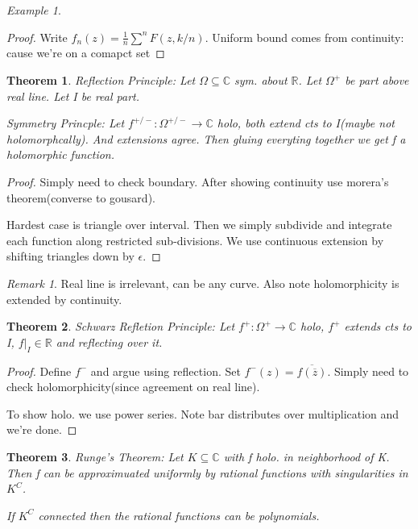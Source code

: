 \documentclass[11pt]{article}
\newcommand{\R}{\mathbb{R}}
\newcommand{\C}{\mathbb{C}}
\newtheorem{theorem}{Theorem}
\theoremstyle{remark}
\newtheorem{remark}{Remark}
\newtheorem{example}{Example}
\begin{document}
\begin{example}
\begin{proof}
	Write $f_n(z) = \frac{1}{n}\sum^n F(z,k/n)$. Uniform bound comes from continuity: cause we're on a comapct set
\end{proof}

\begin{theorem}
	\textit{Reflection Principle}: Let $\Omega \subseteq \C$ sym. about $\R$. Let $\Omega^+$ be part above real line. Let I be real part. 

	\textit{Symmetry Princple:} Let $f^{+/-}: \Omega^{+/-} \to \mathbb{C}$ holo, both extend cts to I(maybe not holomorphcally). And extensions agree. Then gluing everyting together we get f a holomorphic function. 

	
\end{theorem}

\begin{proof}
	Simply need to check boundary. After showing continuity use morera's theorem(converse to gousard). 

	Hardest case is triangle over interval. Then we simply subdivide and integrate each function along restricted sub-divisions. We use continuous extension by shifting triangles down by $\epsilon$. 
\end{proof}

\begin{remark}
	Real line is irrelevant, can be any curve. Also note holomorphicity is extended by continuity.
\end{remark}

\begin{theorem}
	Schwarz Refletion Principle: Let $f^+: \Omega^+ \to \mathbb{C}$ holo, $f^+$ extends cts to I, $f|_I \in \mathbb{R}$ and reflecting over it.
\end{theorem}

\begin{proof}
	Define $f^-$ and argue using reflection. Set $f^-(z) = \overline{f(\overline{z})}$. Simply need to check holomorphicity(since agreement on real line). 

	To show holo. we use power series. Note bar distributes over multiplication and we're done.
\end{proof}
	
\begin{theorem}
	\textit{Runge's Theorem}: Let $K \subseteq \mathbb{C}$ with f holo. in neighborhood of K. Then f can be approximuated uniformly by rational functions with singularities in $K^C$. 

	If $K^C$ connected then the rational functions can be polynomials. 
\end{theorem}


\end{example}
\end{document}
